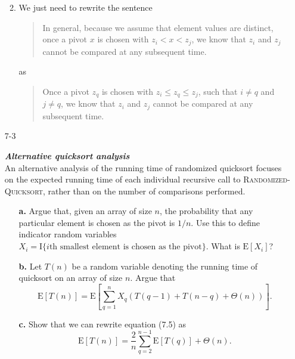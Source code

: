 \begin{enumerate}
\begin{framed}
\begin{enumerate}
{\begin{algorithm}[H]
\SetAlgoNoEnd\DontPrintSemicolon
\BlankLine
{}
\nonl{}
\end{algorithm}
}
\item{We just need to rewrite the sentence
\begin{quote}
  In general, because we assume that element values are distinct, once a pivot
  $x$ is chosen with $z_i < x < z_j$, we know that $z_i$ and $z_j$ cannot be
  compared at any subsequent time.
\end{quote}
as
\begin{quote}
  Once a pivot $z_q$ is chosen with $z_i \le z_q \le z_j$, such that
  $i \neq q$ and $j \neq q$, we know that $z_i$ and $z_j$ cannot be compared at
  any subsequent time.
\end{quote}
}
\end{enumerate}
\end{framed}

\newpage

\item[7{-}3]{\textbf{\emph{Alternative quicksort analysis}}\\
An alternative analysis of the running time of randomized quicksort focuses on
the expected running time of each individual recursive call to
\textsc{Randomized-Quicksort}, rather than on the number of comparisons
performed.

\begin{enumerate}
\item[\textbf{a.}]{Argue that, given an array of size $n$, the probability that
any particular element is chosen as the pivot is $1/n$. Use this to define
indicator random variables
$X_i = \text{I}\{i\text{th smallest element is chosen as the pivot}\}$. What is
$\text{E}[X_i]$?}

\item[\textbf{b.}]{Let $T(n)$ be a random variable denoting the running time of
quicksort on an array of size $n$. Argue that
\[
  \text{E}[T(n)] = \text{E}\left[ \sum_{q = 1}^{n}{X_q (T(q - 1) + T(n - q) + \Theta(n))} \right].
\]}

\item[\textbf{c.}]{Show that we can rewrite equation (7.5) as
\[
  \text{E}[T(n)] = \frac{2}{n} \sum_{q = 2}^{n - 1} \text{E}[T(q)] + \Theta(n).
\]}


\end{enumerate}}
\end{enumerate}
